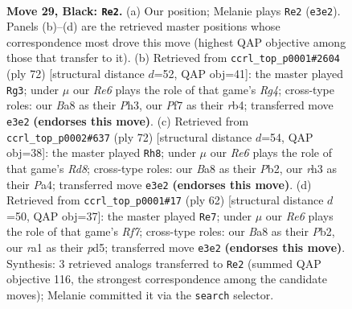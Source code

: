 \documentclass[11pt]{article}
\begin{document}
\clearpage

\begin{figure}[p]\centering
\begin{subfigure}{0.46\textwidth}\centering
\resizebox{\linewidth}{!}{%
\newchessgame
\chessboard[
  setfen={b3k2r/P4p2/6pn/4P3/8/4rNKR/6P1/R2N4 b k - 4 29},
  showmover=false,
  pgfstyle=straightmove, color=movearrow, markmove={e3-e2}
]}
\caption{}
\end{subfigure}\hfill
\begin{subfigure}{0.46\textwidth}\centering
\resizebox{\linewidth}{!}{%
\newchessgame
\chessboard[
  setfen={2r4k/6p1/5n1p/R1N5/1r1p2R1/1P5P/5P2/6K1 w - - 4 37},
  showmover=false,
  pgfstyle=straightmove, color=movearrow, markmove={g4-g3}
]}
\caption{}
\end{subfigure}
\\[4pt]
\begin{subfigure}{0.46\textwidth}\centering
\resizebox{\linewidth}{!}{%
\newchessgame
\chessboard[
  setfen={3R4/p2r3p/1p2k1p1/4rnP1/P3BR1P/8/KP6/8 w - - 1 37},
  showmover=false,
  pgfstyle=straightmove, color=movearrow, markmove={d8-h8}
]}
\caption{}
\end{subfigure}\hfill
\begin{subfigure}{0.46\textwidth}\centering
\resizebox{\linewidth}{!}{%
\newchessgame
\chessboard[
  setfen={2kr4/1p3Rp1/p2n4/P2pN1r1/8/8/1PP2P2/1K2R3 w - - 1 32},
  showmover=false,
  pgfstyle=straightmove, color=movearrow, markmove={f7-e7}
]}
\caption{}
\end{subfigure}
\caption{\textbf{Move 29, Black: \texttt{Re2}.} (a) Our position; Melanie plays \texttt{Re2} (\texttt{e3e2}). Panels (b)--(d) are the retrieved master positions whose correspondence most drove this move (highest QAP objective among those that transfer to it). (b) Retrieved from \texttt{ccrl\_top\_p0001\#2604} (ply 72) [structural distance $d$=52, QAP obj=41]: the master played \texttt{Rg3}; under $\mu$ our \emph{Re6} plays the role of that game's \emph{Rg4}; cross-type roles: our \emph{B}a8 as their \emph{P}h3, our \emph{P}f7 as their \emph{r}b4; transferred move \texttt{e3e2} \textbf{(endorses this move)}. (c) Retrieved from \texttt{ccrl\_top\_p0002\#637} (ply 72) [structural distance $d$=54, QAP obj=38]: the master played \texttt{Rh8}; under $\mu$ our \emph{Re6} plays the role of that game's \emph{Rd8}; cross-type roles: our \emph{B}a8 as their \emph{P}b2, our \emph{r}h3 as their \emph{P}a4; transferred move \texttt{e3e2} \textbf{(endorses this move)}. (d) Retrieved from \texttt{ccrl\_top\_p0001\#17} (ply 62) [structural distance $d$=50, QAP obj=37]: the master played \texttt{Re7}; under $\mu$ our \emph{Re6} plays the role of that game's \emph{Rf7}; cross-type roles: our \emph{B}a8 as their \emph{P}b2, our \emph{r}a1 as their \emph{p}d5; transferred move \texttt{e3e2} \textbf{(endorses this move)}. Synthesis: 3 retrieved analogs transferred to \texttt{Re2} (summed QAP objective 116, the strongest correspondence among the candidate moves); Melanie committed it via the \texttt{search} selector.}
\label{fig:thought-m57}
\end{figure}
\end{document}

